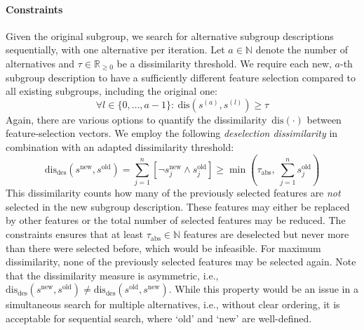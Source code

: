 \documentclass{article}
\theoremstyle{definition}
\begin{document}
\paragraph{Constraints}

Given the original subgroup, we search for alternative subgroup descriptions sequentially, with one alternative per iteration.
Let $a \in \mathbb{N}$ denote the number of alternatives and $\tau \in \mathbb{R}_{\geq 0}$ be a dissimilarity threshold.
We require each new, $a$-th subgroup description to have a sufficiently different feature selection compared to all {existing subgroups}, including the original one:
%
\begin{equation}
	\forall l \in \{0, \dots, a-1\}:~ \text{dis}(s^{(a)}, s^{(l)}) \geq \tau
	\label{eq:csd:constraint-dissimilarity-general}
\end{equation}
%
Again, there are various options to quantify the dissimilarity~$\text{dis}(\cdot)$ between feature-selection vectors.
We employ the following \emph{deselection dissimilarity} in combination with an adapted dissimilarity threshold:
%
\begin{equation}
	\text{dis}_{\text{des}}(s^{\text{new}}, s^{\text{old}}) = \sum_{j=1}^n [\lnot s^{\text{new}}_j \land s^{\text{old}}_j] \geq \min \left( \tau_{\text{abs}},~\sum_{j=1}^n s^{\text{old}}_j \right)
	\label{eq:csd:constraint-dissimilarity-special}
\end{equation}
%
This dissimilarity counts how many of the previously selected features are \emph{not} selected in the new subgroup description.
These features may either be replaced by other features or the total number of selected features may be reduced.
The constraints ensures that at least $\tau_{\text{abs}} \in \mathbb{N}$ features are deselected but never more than there were selected before, which would be infeasible.
For maximum dissimilarity, none of the previously selected features may be selected again.
Note that the dissimilarity measure is asymmetric, i.e., $\text{dis}_{\text{des}}(s^{\text{new}}, s^{\text{old}}) \neq \text{dis}_{\text{des}}(s^{\text{old}}, s^{\text{new}})$.
While this property would be an issue in a simultaneous search for multiple alternatives, i.e., without clear ordering, it is acceptable for sequential search, where `old' and `new' are well-defined.
\end{document}
